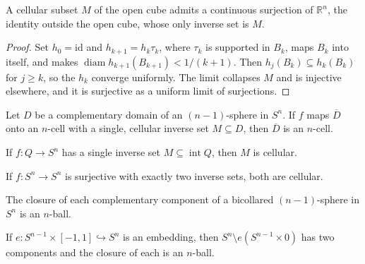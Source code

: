 \begin{theorem}
  \label{thm:brown1}
  \leanok
  A cellular subset $M$ of the open cube admits a continuous surjection of
  $\mathbb{R}^n$, the identity outside the open cube, whose only inverse set is $M$.
\end{theorem}

\begin{proof}
  \leanok
  Set $h_0=\mathrm{id}$ and $h_{k+1}=h_k\tau_k$, where $\tau_k$ is supported in $B_k$,
  maps $B_k$ into itself, and makes $\operatorname{diam} h_{k+1}(B_{k+1})<1/(k+1)$.
  Then $h_j(B_k)\subseteq h_k(B_k)$ for $j\ge k$, so the $h_k$ converge uniformly. The
  limit collapses $M$ and is injective elsewhere, and it is surjective as a uniform
  limit of surjections.
\end{proof}

\begin{theorem}
  \label{thm:brown2}
  Let $D$ be a complementary domain of an $(n-1)$-sphere in $S^n$. If $f$ maps
  $\overline{D}$ onto an $n$-cell with a single, cellular inverse set $M\subseteq D$,
  then $\overline{D}$ is an $n$-cell.
\end{theorem}

\begin{theorem}
  \label{thm:brown3}
  If $f\colon Q\to S^n$ has a single inverse set $M\subseteq\operatorname{int}Q$,
  then $M$ is cellular.
\end{theorem}

\begin{theorem}
  \label{thm:brown4}
  \leanok
  If $f\colon S^n\to S^n$ is surjective with exactly two inverse sets, both are
  cellular.
\end{theorem}

\begin{theorem}
  \label{thm:brown5}
  \leanok
  The closure of each complementary component of a bicollared $(n-1)$-sphere in
  $S^n$ is an $n$-ball.
\end{theorem}

\begin{theorem}
  \label{thm:schoenflies}
  \leanok
  If $e\colon S^{n-1}\times[-1,1] \hookrightarrow S^n$ is an embedding, then
  $S^n \setminus e(S^{n-1}\times 0)$ has two components and the closure of each
  is an $n$-ball.
\end{theorem}

